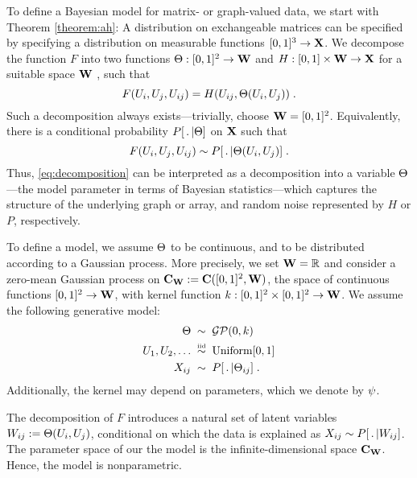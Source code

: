 To define a Bayesian model for matrix- or graph-valued data, we start with Theorem \ref{theorem:ah}: A distribution on exchangeable matrices
can be specified by specifying a distribution on measurable functions $[0,1]^3\rightarrow\mathbf{X}$. 
We decompose the function $F$ into two functions 
${\Theta:[0,1]^2\rightarrow\mathbf{W}}$ 
and ${H:[0,1]\times\mathbf{W}\rightarrow\mathbf{X}}$ for a suitable space $\mathbf{W}$ , such that
\begin{equation}
  \label{eq:decomposition}
  F(U_i,U_j,U_{ij})=H(U_{ij},\Theta(U_i,U_j))\;.
\end{equation}
Such a decomposition always exists---trivially, choose $\mathbf{W}=[0,1]^2$.
Equivalently, there is a conditional probability $P[\,.\,|\Theta]$ on $\mathbf{X}$ such that
\begin{equation}
  \label{eq:decomposition:sampling}
  F(U_i,U_j,U_{ij})\sim P[\,.\,|\Theta(U_i,U_j)]\;.
\end{equation}
Thus, \eqref{eq:decomposition} can be interpreted as a decomposition into a variable $\Theta$---the model parameter in terms of Bayesian statistics---which captures the structure of the underlying graph or array,
and random noise represented by $H$ or $P$, respectively.

To define a model, we assume $\Theta$ to be continuous, and to be distributed according to a Gaussian process. More precisely,
we set ${\mathbf{W} = \mathbb{R}}$ and consider a zero-mean Gaussian process on 
$\mathbf{C}_{\mathbf{W}}:=\mathbf{C}([0,1]^2,\mathbf{W})$, the space of continuous functions $[0,1]^2\rightarrow\mathbf{W}$,
with kernel function 
${k:[0,1]^2\times[0,1]^2\rightarrow\mathbf{W}}$.
We assume the following generative model:
\begin{equation}
  \label{eq:model}
  \begin{split}
    \Theta\; &\sim\; \mathcal{GP}(0,k) \\
    U_{1},U_{2},\ldots\; &\overset{\mbox{\tiny iid}}{\sim}\; \mbox{\rm Uniform}[0,1] \\
    X_{ij}\; &\sim\; P[\,.\,|\Theta_{ij}] \;.
  \end{split}
\end{equation}
Additionally, the kernel may depend on parameters, which we denote by $\psi$.

The decomposition of $F$ introduces a natural set of latent variables $W_{ij}:=\Theta(U_i,U_j)$, conditional on which the
data is explained as $X_{ij}\sim P[\,.\,|W_{ij}]$. 
The parameter space of our the model is the infinite-dimensional space $\mathbf{C}_{\mathbf{W}}$. Hence, the model is nonparametric.

